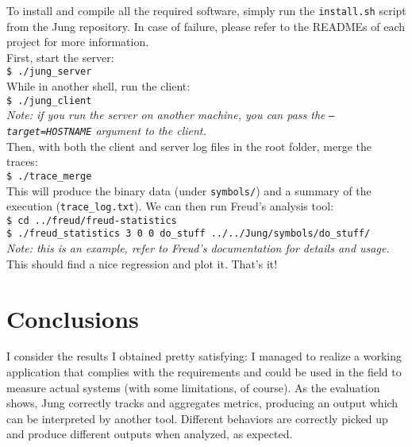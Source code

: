        To install and compile all the required software, simply run the \texttt{install.sh} script from the Jung repository.
        In case of failure, please refer to the READMEs of each project for more information.\\

        First, start the server:\\

        \texttt{\$ ./jung\_server}\\
        
        While in another shell, run the client:\\
        
        \texttt{\$ ./jung\_client}\\

        \textit{Note: if you run the server on another machine, you can pass the \texttt{---target=HOSTNAME}
        argument to the client.}\\

        Then, with both the client and server log files in the root folder, merge the traces:\\

        \texttt{\$ ./trace\_merge}\\

        This will produce the binary data (under \texttt{symbols/}) and a summary of the execution
        (\texttt{trace\_log.txt}).
        We can then run Freud's analysis tool:\\

        \texttt{\$ cd ../freud/freud-statistics}\\

        \texttt{\$ ./freud\_statistics 3 0 0 do\_stuff ../../Jung/symbols/do\_stuff/}\\
        
        \textit{Note: this is an example, refer to Freud's documentation for details and usage.}\\

        This should find a nice regression and plot it. That's it!


\chapter{Conclusions}


    I consider the results I obtained pretty satisfying: I managed to realize a working application
    that complies with the requirements and could be used in the field to measure actual systems
    (with some limitations, of course). As the evaluation shows, Jung correctly tracks and aggregates
    metrics, producing an output which can be interpreted by another tool. Different behaviors are
    correctly picked up and produce different outputs when analyzed, as expected.\\
    
